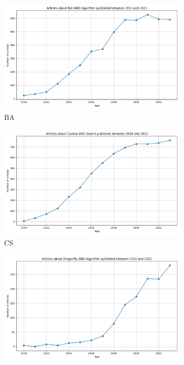 \begin{figure}[H]
  \centering
  \begin{subfigure}[b]{0.45\textwidth}
    \includegraphics[width=\textwidth]{imagenes/scopus_chart_Bat_Algorithm.png}
    \caption{BA}
    \label{fig:bat_algorithm}
  \end{subfigure}
  \begin{subfigure}[b]{0.45\textwidth}
    \includegraphics[width=\textwidth]{imagenes/scopus_chart_Cuckoo_Search.png}
    \caption{CS}
    \label{fig:cuckoo_search}
  \end{subfigure}
  \begin{subfigure}[b]{0.45\textwidth}
    \includegraphics[width=\textwidth]{imagenes/scopus_chart_Dragonfly_Algorithm.png}

\end{subfigure}
\end{figure}
